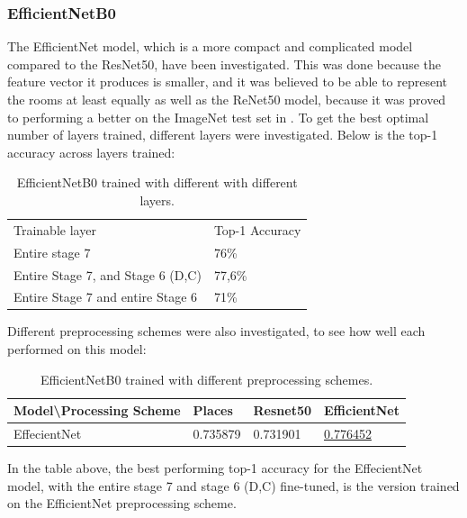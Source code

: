 \subsubsection{EfficientNetB0}
The EfficientNet model, which is a more compact and complicated model compared to the ResNet50, have been investigated. This was done because the feature vector it produces is smaller, and it was believed to be able to represent the rooms at least equally as well as the ReNet50 model, because it was proved to performing a better on the ImageNet test set in \autocite{tan2020efficientnet}. To get the best optimal number of layers trained, different layers were investigated. Below is the top-1 accuracy across layers trained:
\begin{table}[H]
\begin{tabular}{ll}
Trainable layer       & Top-1 Accuracy                       \\
Entire stage 7                          & 76\%                    \\ \cline{2-2}
\multicolumn{1}{l|}{Entire Stage 7, and Stage 6 (D,C)} & \multicolumn{1}{l|}{77,6\%} \\ \cline{2-2}
Entire Stage 7 and entire Stage 6                 & 71\%
\end{tabular}
\caption{EfficientNetB0 trained with different with different layers.}
\end{table}
Different preprocessing schemes were also investigated, to see how well each performed on this model:
\begin{table}[H]
  \centering
\begin{tabular}{llll}
Model\textbackslash{}Processing Scheme & Places                        & Resnet50                                          & EfficientNet                  \\ \hline
\multicolumn{1}{|l|}{EffecientNet}     & \multicolumn{1}{l|}{0.735879} & \multicolumn{1}{l|}{0.731901} & \multicolumn{1}{l|}{\underline{0.776452}} \\ \hline
\end{tabular}
\caption{EfficientNetB0 trained with different preprocessing schemes.}
\end{table}
In the table above, the best performing top-1 accuracy for the EffecientNet model, with the entire stage 7 and stage 6 (D,C) fine-tuned, is the version trained on the EfficientNet preprocessing scheme.
